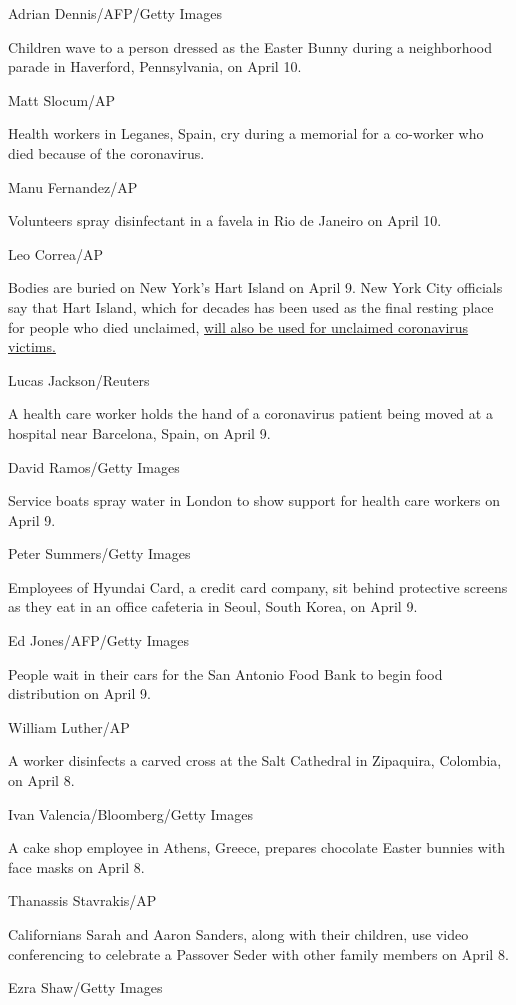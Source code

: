 Adrian Dennis/AFP/Getty Images

Children wave to a person dressed as the Easter Bunny during a
neighborhood parade in Haverford, Pennsylvania, on April 10.

Matt Slocum/AP

Health workers in Leganes, Spain, cry during a memorial for a co-worker
who died because of the coronavirus.

Manu Fernandez/AP

Volunteers spray disinfectant in a favela in Rio de Janeiro on April 10.

Leo Correa/AP

Bodies are buried on New York's Hart Island on April 9. New York City
officials say that Hart Island, which for decades has been used as the
final resting place for people who died unclaimed,
\href{https://www.cnn.com/2020/04/10/us/new-york-hart-island-burials/index.html}{will
also be used for unclaimed coronavirus victims.}

Lucas Jackson/Reuters

A health care worker holds the hand of a coronavirus patient being moved
at a hospital near Barcelona, Spain, on April 9.

David Ramos/Getty Images

Service boats spray water in London to show support for health care
workers on April 9.

Peter Summers/Getty Images

Employees of Hyundai Card, a credit card company, sit behind protective
screens as they eat in an office cafeteria in Seoul, South Korea, on
April 9.

Ed Jones/AFP/Getty Images

People wait in their cars for the San Antonio Food Bank to begin food
distribution on April 9.

William Luther/AP

A worker disinfects a carved cross at the Salt Cathedral in Zipaquira,
Colombia, on April 8.

Ivan Valencia/Bloomberg/Getty Images

A cake shop employee in Athens, Greece, prepares chocolate Easter
bunnies with face masks on April 8.

Thanassis Stavrakis/AP

Californians Sarah and Aaron Sanders, along with their children, use
video conferencing to celebrate a Passover Seder with other family
members on April 8.

Ezra Shaw/Getty Images

